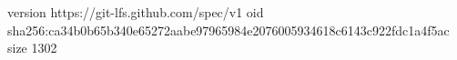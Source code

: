 version https://git-lfs.github.com/spec/v1
oid sha256:ca34b0b65b340e65272aabe97965984e2076005934618c6143c922fdc1a4f5ac
size 1302
